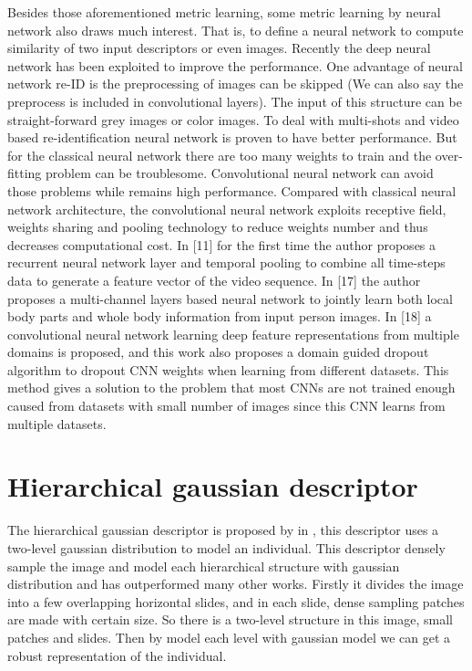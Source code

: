 \documentclass[conference,compsoc]{IEEEtran}
\begin{document}
Besides those aforementioned metric learning, some metric learning by neural network also draws much interest. That is, to define a neural network to compute similarity of two input descriptors or even images. Recently the deep neural network has been exploited to improve the performance. One advantage of neural network re-ID is the preprocessing of images can be skipped (We can also say the preprocess is included in convolutional layers). The input of this structure can be straight-forward grey images or color images. To deal with multi-shots and video based re-identification neural network is proven to have better performance. But for the classical neural network there are too many weights to train and the over-fitting problem can be troublesome. Convolutional neural network can avoid those problems while remains high performance. Compared with classical neural network architecture, the convolutional neural network exploits receptive field, weights sharing and pooling technology to reduce weights number and thus decreases computational cost. In [11] for the first time the author proposes a recurrent neural network layer and temporal pooling to combine all time-steps data to generate a feature vector of the video sequence. In [17] the author proposes a multi-channel layers based neural network to jointly learn both local body parts and whole body information from input person images.  In [18] a convolutional neural network learning deep feature representations from multiple domains is proposed, and this work also proposes a domain guided dropout algorithm to dropout CNN weights when learning from different datasets. This method gives a solution to the problem that most CNNs are not trained enough caused from datasets with small number of images since this CNN learns from multiple datasets.



\section{Hierarchical gaussian descriptor}

The hierarchical gaussian descriptor is proposed by in  \cite{GOGpaper}, this descriptor uses a two-level gaussian distribution to model an individual. This descriptor densely sample the image and model each hierarchical structure with gaussian distribution and has outperformed many other works. Firstly it divides the image into a few overlapping horizontal slides, and in each slide, dense sampling patches are made with certain size. So there is a  two-level structure in this image, small patches and slides. Then by model each level with gaussian model we can get a robust representation of the individual.
\end{document}
